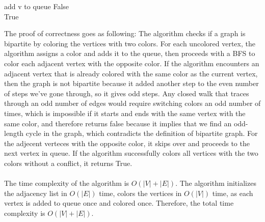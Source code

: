 \documentclass[10pt]{article}
\begin{document}
\begin{solution}
\begin{enumerate}[(a)]
\begin{algorithm}
\begin{algorithmic}[1]
                                \State add v to queue
                                \State \Return False
                            \EndIf
                        \EndFor
                    \EndWhile
                \EndIf \\
            \Return True
            \end{algorithmic}
        \end{algorithm}
    \end{enumerate}
    The proof of correctness goes as following: The algorithm checks if a graph is bipartite by coloring the vertices with two colors. For each uncolored vertex, the algorithm assigns a color and adds it to the queue, then proceeds with a BFS to color each adjacent vertex
    with the opposite color. If the algorithm encounters an adjacent vertex that is already colored with the same color as the current vertex, then the graph is not bipartite because it added another step to the even number of steps we've gone through, so it gives odd steps. Any closed walk that traces through an odd number of edges would require switching colors an odd number of times, which is impossible if it starts and ends with the same vertex with the same color,
    and therefore returns false because it implies that we find an odd-length cycle in the graph, which contradicts the definition of bipartite graph. For the adjecent verteces with the opposite color, it skips over and proceeds to the next vertex in queue.
    If the algorithm successfully colors all vertices with the two colors without a conflict, it returns True.
    \\ \\
    The time complexity of the algorithm is $O(|V|+|E|)$. The algorithm initializes the adjacency list in $O(|E|)$ time, colors the vertices in $O(|V|)$ time, as each vertex is added to queue once and colored once. Therefore, the total time complexity is $O(|V|+|E|)$.
\end{solution}
\newpage


\end{document}
